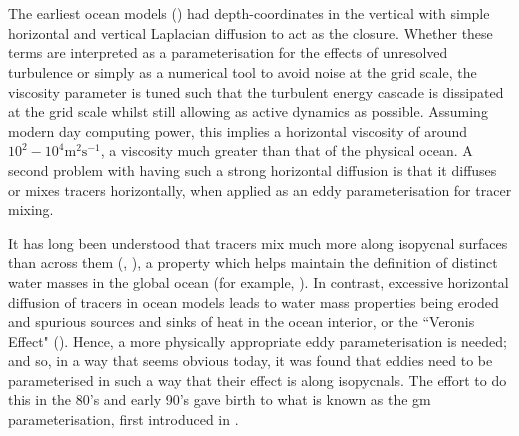 \documentclass[12pt,a4paper]{report}
\begin{document}
 \section{\cite{gent1990}}
 
 The earliest ocean models (\cite{bryan1969numerical}) had depth-coordinates in the vertical
 with simple horizontal and vertical Laplacian diffusion to act as 
 the closure. Whether these terms are interpreted as a parameterisation for the effects
 of unresolved turbulence or simply as a numerical tool to avoid noise at 
 the grid scale, the viscosity parameter is tuned such that the turbulent energy cascade is 
 dissipated at the grid scale whilst still allowing as active dynamics as possible. 
 Assuming modern day computing power, this implies a horizontal viscosity of around 
 $10^{2} - 10^{4} \mathrm{m^{2}s^{-1}} $, a viscosity much greater than 
 that of the physical ocean. A second problem with having such a strong horizontal diffusion is
 that it diffuses or mixes tracers horizontally, when applied as
 an eddy parameterisation for tracer mixing. 
 
 It has long been understood that tracers 
 mix much more along isopycnal surfaces than across them (\cite{iselin1939influence}, \cite{montgomery1940present}),  a property which helps maintain the definition of
 distinct water masses in the global ocean (for example, \cite{emery1986global}).
  In contrast, excessive horizontal diffusion
 of tracers in ocean models leads to water mass properties
 being eroded and spurious sources and sinks of heat in the 
 ocean interior, or the ``Veronis Effect" (\cite{veronis1975role}).
 Hence, a more physically appropriate eddy parameterisation 
 is needed;
  and so, in a way that seems obvious today, it was found that eddies need to be
   parameterised in 
 such a way that their effect is along isopycnals. 
 The effort to do this in the 80's and early 90's gave birth
 to what is known as the \gls{gm} parameterisation, first introduced in \cite{gent1990}.
 
\end{document}
